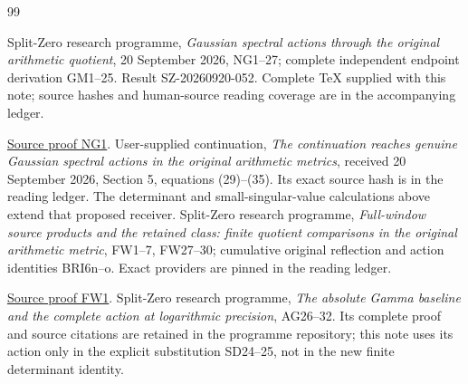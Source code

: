 \documentclass[11pt]{article}
\begin{document}
\clearpage
\begin{thebibliography}{99}

 Split-Zero research programme, \emph{Gaussian spectral
actions through the original arithmetic quotient}, 20 September 2026,
NG1--27; complete independent endpoint derivation GM1--25. Result
SZ-20260920-052. Complete TeX supplied with this note; source hashes and
human-source reading coverage are in the accompanying ledger.

\href{https://github.com/KokunoYumeto/zeta-function-research-reader/blob/5992ad50c0f2a06921f1fcaded7b4e38097c0739/workbenches/splitzero-tandem/continuations/20260920-original-kernel-mixed-determinants/providers/GAUSSIAN_ARITHMETIC_RETURN.tex\#L31}{Source proof NG1}.
 User-supplied continuation, \emph{The continuation
reaches genuine Gaussian spectral actions in the original arithmetic
metrics}, received 20 September 2026, Section 5, equations (29)--(35).
Its exact source hash is in the reading ledger. The determinant and
small-singular-value calculations above extend that proposed receiver.
 Split-Zero research programme, \emph{Full-window source
products and the retained class: finite quotient comparisons in the
original arithmetic metric}, FW1--7, FW27--30; cumulative original
reflection and action identities BRI6n--o. Exact providers are pinned
in the reading ledger.

\href{https://github.com/KokunoYumeto/zeta-function-research-reader/blob/5992ad50c0f2a06921f1fcaded7b4e38097c0739/workbenches/splitzero-tandem/continuations/20260920-original-kernel-mixed-determinants/providers/FULL_WINDOW_SOURCE_PRODUCTS.tex\#L28}{Source proof FW1}.
 Split-Zero research programme, \emph{The absolute Gamma
baseline and the complete action at logarithmic precision}, AG26--32.
Its complete proof and source citations are retained in the programme
repository; this note uses its action only in the explicit substitution
SD24--25, not in the new finite determinant identity.


\end{thebibliography}
\end{document}
